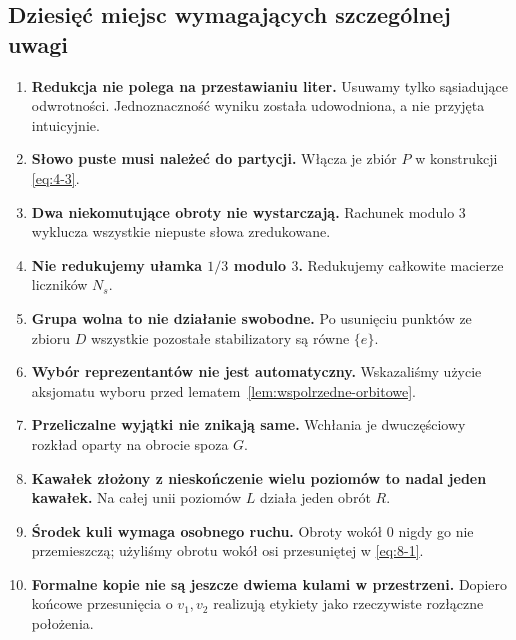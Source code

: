 \subsection{Dziesięć miejsc wymagających szczególnej uwagi}
\begin{enumerate}
\item \textbf{Redukcja nie polega na przestawianiu liter.} Usuwamy tylko sąsiadujące odwrotności. Jednoznaczność wyniku została udowodniona, a nie przyjęta intuicyjnie.
\item \textbf{Słowo puste musi należeć do partycji.} Włącza je zbiór $P$ w konstrukcji \eqref{eq:4-3}.
\item \textbf{Dwa niekomutujące obroty nie wystarczają.} Rachunek modulo $3$ wyklucza wszystkie niepuste słowa zredukowane.
\item \textbf{Nie redukujemy ułamka $1/3$ modulo $3$.} Redukujemy całkowite macierze liczników $N_s$.
\item \textbf{Grupa wolna to nie działanie swobodne.} Po usunięciu punktów ze zbioru $D$ wszystkie pozostałe stabilizatory są równe $\{e\}$.
\item \textbf{Wybór reprezentantów nie jest automatyczny.} Wskazaliśmy użycie aksjomatu wyboru przed lematem~\ref{lem:wspolrzedne-orbitowe}.
\item \textbf{Przeliczalne wyjątki nie znikają same.} Wchłania je dwuczęściowy rozkład oparty na obrocie spoza $G$.
\item \textbf{Kawałek złożony z nieskończenie wielu poziomów to nadal jeden kawałek.} Na całej unii poziomów $L$ działa jeden obrót $R$.
\item \textbf{Środek kuli wymaga osobnego ruchu.} Obroty wokół $0$ nigdy go nie przemieszczą; użyliśmy obrotu wokół osi przesuniętej w \eqref{eq:8-1}.
\item \textbf{Formalne kopie nie są jeszcze dwiema kulami w przestrzeni.} Dopiero końcowe przesunięcia o $v_1,v_2$ realizują etykiety jako rzeczywiste rozłączne położenia.
\end{enumerate}
